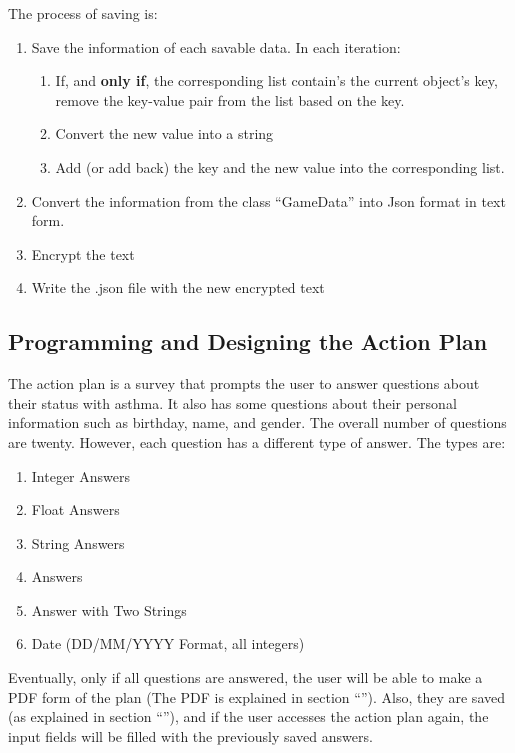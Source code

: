 The process of saving is:

\begin{enumerate}
\item{Save the information of each savable data. In each iteration:}
\begin{enumerate}
\item{If, and \textbf{only if}, the corresponding list contain's the current object's key, remove the key-value pair from the list based on the key.}
\item{Convert the new value into a string}
\item{Add (or add back) the key and the new value into the corresponding list.}
\end{enumerate}
\item{Convert the information from the class  “{\codefont GameData}” into Json format in text form.}
\item{Encrypt the text}
\item{Write the .json file with the new encrypted text}
\end{enumerate}

\subsection{Programming and Designing the Action Plan}
The action plan is a survey that prompts the user to answer questions about their status with asthma. It also has some questions about their personal information such as birthday, name, and gender. The overall number of questions are twenty. However, each question has a different type of answer. The types are:
\begin{enumerate}
    \item{Integer Answers}
    
    \item{Float Answers}
    
    \item{String Answers}
    
    \item{ Answers}
    
    \item{Answer with Two Strings}
    
    \item{Date (DD/MM/YYYY Format, all integers)}
\end{enumerate}
Eventually, only if all questions are answered, the user will be able to make a PDF form of the plan (The PDF is explained in section “\textbf{}”). Also, they are saved (as explained in section “\textbf{}”), and if the user accesses the action plan again, the input fields will be filled with the previously saved answers.

